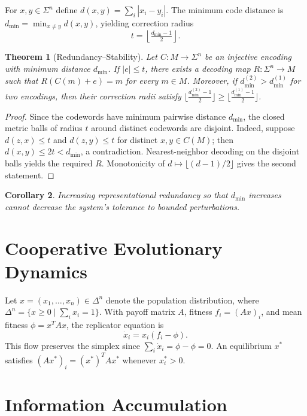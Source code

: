 \documentclass[12pt]{article}
\newtheorem{theorem}{Theorem}[section]
\newtheorem{corollary}[theorem]{Corollary}
\begin{document}
For $x,y \in \Sigma^n$ define $d(x,y) = \sum_i |x_i - y_i|$. The minimum code distance is $d_{\min} = \min_{x \neq y} d(x,y)$, yielding correction radius
\[
t = \left\lfloor \tfrac{d_{\min}-1}{2} \right\rfloor.
\]

\begin{theorem}[Redundancy--Stability]
Let $C : M \to \Sigma^n$ be an injective encoding with minimum distance $d_{\min}$. If $|e| \le t$, there exists a decoding map $R : \Sigma^n \to M$ such that $R(C(m)+e)=m$ for every $m \in M$. Moreover, if $d_{\min}^{(2)} > d_{\min}^{(1)}$ for two encodings, then their correction radii satisfy $\lfloor \tfrac{d_{\min}^{(2)}-1}{2} \rfloor \ge \lfloor \tfrac{d_{\min}^{(1)}-1}{2} \rfloor$.
\end{theorem}

\begin{proof}
Since the codewords have minimum pairwise distance $d_{\min}$, the closed metric balls of radius $t$ around distinct codewords are disjoint. Indeed, suppose $d(z,x) \le t$ and $d(z,y) \le t$ for distinct $x,y \in C(M)$; then $d(x,y) \le 2t < d_{\min}$, a contradiction. Nearest-neighbor decoding on the disjoint balls yields the required $R$. Monotonicity of $d \mapsto \lfloor (d-1)/2 \rfloor$ gives the second statement.
\end{proof}

\begin{corollary}
Increasing representational redundancy so that $d_{\min}$ increases cannot decrease the system's tolerance to bounded perturbations.
\end{corollary}

\section{Cooperative Evolutionary Dynamics}

Let $x = (x_1,\dots,x_n) \in \Delta^n$ denote the population distribution, where $\Delta^n = \{x \ge 0 \mid \sum_i x_i = 1\}$. With payoff matrix $A$, fitness $f_i = (Ax)_i$, and mean fitness $\phi = x^T Ax$, the replicator equation is
\[
\dot{x}_i = x_i(f_i - \phi).
\]
This flow preserves the simplex since $\sum_i \dot{x}_i = \phi - \phi = 0$. An equilibrium $x^*$ satisfies $(Ax^*)_i = (x^*)^T Ax^*$ whenever $x_i^* > 0$.

\section{Information Accumulation}
\end{document}
